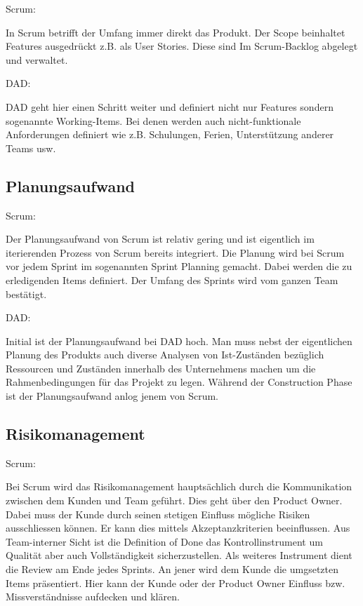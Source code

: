 {\Large Scrum:} \medskip

In Scrum betrifft der Umfang immer direkt das Produkt. Der Scope beinhaltet Features ausgedrückt z.B. als User Stories. Diese sind Im Scrum-Backlog abgelegt und verwaltet.
\bigskip 

{\Large DAD:} \cite{planningScopeDad} \medskip

DAD geht hier einen Schritt weiter und definiert nicht nur Features sondern sogenannte Working-Items. Bei denen werden auch nicht-funktionale Anforderungen definiert wie z.B. Schulungen, Ferien, Unterstützung anderer Teams usw.	


\subsection{Planungsaufwand}

{\Large Scrum:} \medskip

Der Planungsaufwand von Scrum ist relativ gering und ist eigentlich im iterierenden Prozess von Scrum bereits integriert. Die Planung wird bei Scrum vor jedem Sprint im sogenannten Sprint Planning gemacht. Dabei werden die zu erledigenden Items definiert. Der Umfang des Sprints wird vom ganzen Team bestätigt.\bigskip 

{\Large DAD:} \medskip

Initial ist der Planungsaufwand bei DAD hoch. Man muss nebst der eigentlichen Planung des Produkts auch diverse Analysen von Ist-Zuständen bezüglich Ressourcen und Zuständen innerhalb des Unternehmens machen um die Rahmenbedingungen für das Projekt zu legen. Während der Construction Phase ist der Planungsaufwand anlog jenem von Scrum.


\subsection{Risikomanagement}

{\Large Scrum:} \medskip

Bei Scrum wird das Risikomanagement hauptsächlich durch die Kommunikation zwischen dem Kunden und Team geführt. Dies geht über den Product Owner. Dabei muss der Kunde durch seinen stetigen Einfluss mögliche Risiken ausschliessen können. Er kann dies mittels Akzeptanzkriterien beeinflussen.\newline
Aus Team-interner Sicht ist die Definition of Done das Kontrollinstrument um Qualität aber auch Vollständigkeit sicherzustellen.
Als weiteres Instrument dient die Review am Ende jedes Sprints. An jener wird dem Kunde die umgsetzten Items präsentiert. Hier kann der Kunde oder der Product Owner Einfluss bzw. Missverständnisse aufdecken und klären.

